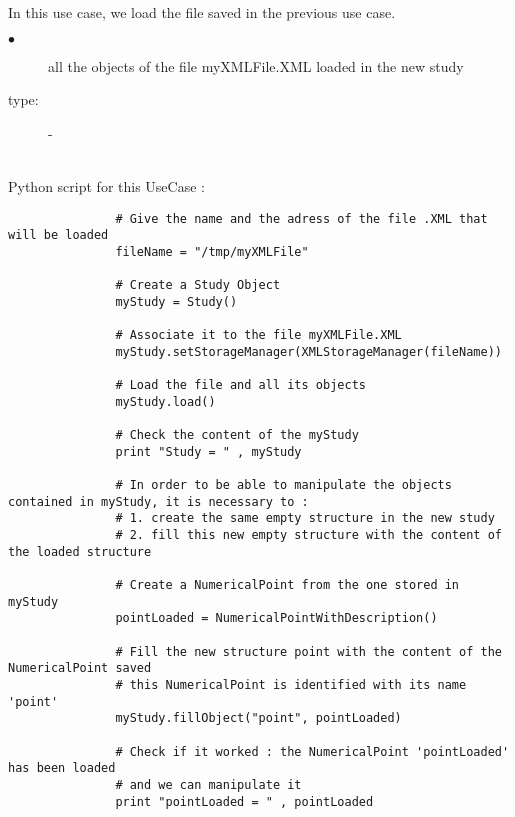 In this use case, we load the file saved in the previous use case. \\

             {
               \begin{description}
               \item[$\bullet$] all the objects of the file myXMLFile.XML loaded in the new study
               \item[type:] -
               \end{description}
             }

             \textspace\\
             Python  script for this UseCase :

             \begin{lstlisting}
               # Give the name and the adress of the file .XML that will be loaded
               fileName = "/tmp/myXMLFile"

               # Create a Study Object
               myStudy = Study()

               # Associate it to the file myXMLFile.XML
               myStudy.setStorageManager(XMLStorageManager(fileName))

               # Load the file and all its objects
               myStudy.load()

               # Check the content of the myStudy
               print "Study = " , myStudy

               # In order to be able to manipulate the objects contained in myStudy, it is necessary to :
               # 1. create the same empty structure in the new study
               # 2. fill this new empty structure with the content of the loaded structure

               # Create a NumericalPoint from the one stored in myStudy
               pointLoaded = NumericalPointWithDescription()

               # Fill the new structure point with the content of the NumericalPoint saved
               # this NumericalPoint is identified with its name 'point'
               myStudy.fillObject("point", pointLoaded)

               # Check if it worked : the NumericalPoint 'pointLoaded' has been loaded
               # and we can manipulate it
               print "pointLoaded = " , pointLoaded
             \end{lstlisting}
